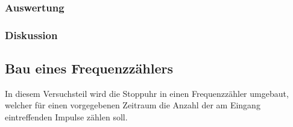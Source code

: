 \documentclass[12pt,a4paper]{article}
\begin{document}
\subsubsection*{Auswertung}
\subsubsection*{Diskussion}






\subsection{Bau eines Frequenzzählers}
In diesem Versuchsteil wird die Stoppuhr in einen Frequenzzähler umgebaut, welcher für einen vorgegebenen Zeitraum die Anzahl der am Eingang eintreffenden Impulse zählen soll.
\end{document}
